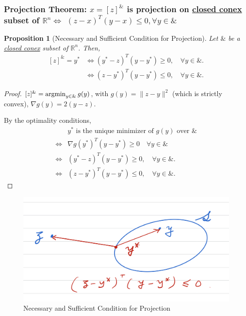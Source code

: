 \documentclass[11pt,a4paper]{article}
\newcommand{\argmin}{\operatornamewithlimits{argmin}}
\newtheorem{proposition}{Proposition}
\begin{document}
\subsubsection{Projection Theorem: $x=[z]^\&$ is projection on \underline{closed conex} subset of $\mathbb{R}^n$$\Leftrightarrow$ $(z-x)^T(y-x)\leq 0, \forall y\in\&$}
\begin{proposition}
    [Necessary and Sufficient Condition for Projection]
    Let $\&$ be a \underline{closed conex} subset of $\mathbb{R}^n$. Then,
    \begin{equation}
        \begin{aligned}
            [z]^\&=y^*
            &\Leftrightarrow (y^*-z)^T(y-y^*)\geq 0,\quad \forall y\in\&.\\
            &\Leftrightarrow (z-y^*)^T(y-y^*)\leq 0,\quad \forall y\in\&.
        \end{aligned}
        \nonumber
    \end{equation}
\end{proposition}
\begin{proof}
    $[z]^\& = \argmin_{y\in\&}g(y)$, with $g(y)=\|z-y\|^2$ (which is strictly convex), $\nabla g(y)=2(y-z)$.

    By the optimality conditions,
    \begin{equation}
        \begin{aligned}
            &y^*\text{ is the unique minimizer of $g(y)$ over $\&$}\\
            \Leftrightarrow	& \nabla g(y^*)^T(y-y^*)\geq 0\quad \forall y\in\&\\
            \Leftrightarrow & (y^*-z)^T(y-y^*)\geq 0,\quad \forall y\in\&.\\
            \Leftrightarrow &(z-y^*)^T(y-y^*)\leq 0,\quad \forall y\in\&.
        \end{aligned}
        \nonumber
    \end{equation}
\end{proof}
\begin{center}\begin{figure}[htbp]
    \centering
    \includegraphics[scale=0.3]{projection3.png}
    \caption{Necessary and Sufficient Condition for Projection}
    \label{}
\end{figure}\end{center}
\end{document}
